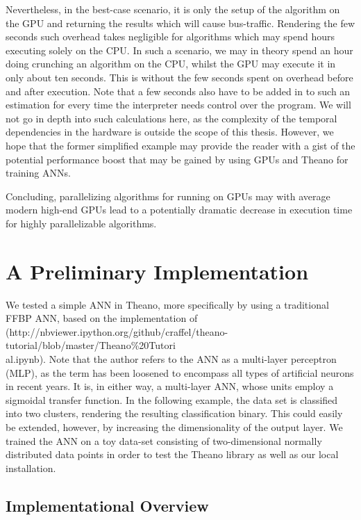 Nevertheless, in the best-case scenario, it is only the setup of the algorithm on the GPU and returning the results which will cause bus-traffic. Rendering the few seconds such overhead takes negligible for algorithms which may spend hours executing solely on the CPU. In such a scenario, we may in theory spend an hour doing crunching an algorithm on the CPU, whilst the GPU may execute it in only about ten seconds. This is without the few seconds spent on overhead before and after execution. Note that a few seconds also have to be added in to such an estimation for every time the interpreter needs control over the program. We will not go in depth into such calculations here, as the complexity of the temporal dependencies in the hardware is outside the scope of this thesis. However, we hope that the former simplified example may provide the reader with a gist of the potential performance boost that may be gained by using GPUs and Theano for training ANNs.

Concluding, parallelizing algorithms for running on GPUs may with average modern high-end GPUs lead to a potentially dramatic decrease in execution time for highly parallelizable algorithms.

\section{A Preliminary Implementation}

We tested a simple ANN in Theano, more specifically by using a traditional FFBP ANN, based on the implementation of
\\(http://nbviewer.ipython.org/github/craffel/theano-tutorial/blob/master/Theano\%20Tutori
\\al.ipynb). Note that the author refers to the ANN as a multi-layer perceptron (MLP), as the term has been loosened to encompass all types of artificial neurons in recent years. It is, in either way, a multi-layer ANN, whose units employ a sigmoidal transfer function. In the following example, the data set is classified into two clusters, rendering the resulting classification binary. This could easily be extended, however, by increasing the dimensionality of the output layer. We trained the ANN on a toy data-set consisting of two-dimensional normally distributed data points in order to test the Theano library as well as our local installation.


\subsection{Implementational Overview}

